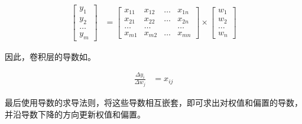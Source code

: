 \begin{equation}\label{eq:convolution-layer}
\begin{aligned}
\begin{bmatrix}
y_1 \\ y_2 \\ \dots \\ y_m
\end{bmatrix}
&=
\begin{bmatrix}
x_{11} & x_{12} & \dots & x_{1n} \\
x_{21} & x_{22} & \dots & x_{2n} \\
\dots & \dots &   & \dots \\
x_{m1} & x_{m2} & \dots & x_{mn} 
\end{bmatrix}
\times
\begin{bmatrix}
w_1 \\ w_2 \\ \dots \\ w_n
\end{bmatrix}
\end{aligned}
\end{equation}

因此，卷积层的导数如。

\begin{equation}\label{eq:convolution-bp}
\begin{aligned}
\frac{\Delta y_i}{\Delta w_j} &= x_{ij}
\end{aligned}
\end{equation}

最后使用导数的求导法则，将这些导数相互嵌套，即可求出对权值和偏置的导数，并沿导数下降的方向更新权值和偏置。

